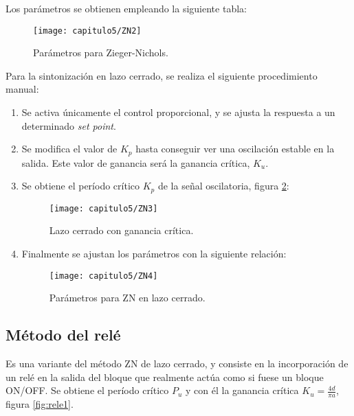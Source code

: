 Los parámetros  se obtienen empleando la siguiente tabla: 

\smallskip
\begin{figure}[H]%
\noindent \begin{centering}
\texttt{[image: capitulo5/ZN2]}
\par\end{centering}
\caption{\label{fig:ZN2} Parámetros  para Zieger-Nichols\cite{Ibrahim}.}
\end{figure}
\smallskip

Para la sintonización en lazo cerrado, se realiza el siguiente procedimiento manual:

\begin{enumerate}
\item Se activa únicamente el control proporcional, y se ajusta la respuesta a un determinado \textit{set point}.
\item Se modifica el valor de $K_{p}$ hasta conseguir ver una oscilación estable en la salida. Este
valor de ganancia será la ganancia crítica, $K_{u}$.
\item Se obtiene el período crítico $K_{p}$ de la señal oscilatoria, figura \ref{fig:ZN3}:

\smallskip
\begin{figure}[H]%
\noindent \begin{centering}
\texttt{[image: capitulo5/ZN3]}
\par\end{centering}
\caption{\label{fig:ZN3} Lazo cerrado con ganancia crítica\cite{Ibrahim}.}
\end{figure}
\smallskip

\item Finalmente se ajustan los parámetros con la siguiente relación:

\smallskip
\begin{figure}[H]%
\noindent \begin{centering}
\texttt{[image: capitulo5/ZN4]}
\par\end{centering}
\caption{\label{fig:ZN4} Parámetros  para ZN en lazo cerrado\cite{Ibrahim}.}
\end{figure}
\smallskip

\end{enumerate}

\subsection{Método del relé}
Es una variante del método ZN de lazo cerrado, y consiste en la incorporación de un
relé en la salida del bloque  que realmente actúa como si fuese un bloque ON/OFF. Se
obtiene el período crítico $P_{u}$ y con él la ganancia crítica $K_{u}=\frac{4d}{\pi a}$, figura \ref{fig:rele1}.

